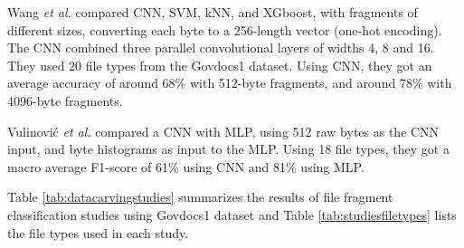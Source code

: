 Wang \textit{et al.} \cite{wang_file_2018}  
compared CNN, SVM, kNN, and XGboost, with fragments of different sizes, converting each byte to a 256-length vector (one-hot encoding). The CNN combined three parallel convolutional layers of widths 4, 8 and 16.
They used 20 file types from the Govdocs1 dataset.
Using CNN, they got an average accuracy of around 68\% with 512-byte fragments, and around 78\% with 4096-byte fragments.

Vulinović \textit{et al.} \cite{vulinovic_neural_2019}
compared a CNN with MLP, using 512 raw bytes as the CNN input, and byte histograms as input to the MLP.
Using 18 file types, they got a macro average F1-score of 61\% using CNN and 81\% using MLP.

Table \ref{tab:datacarvingstudies} summarizes 
the results of file fragment classification studies using Govdocs1 dataset and Table \ref{tab:studiesfiletypes}
lists the file types used in each study.

